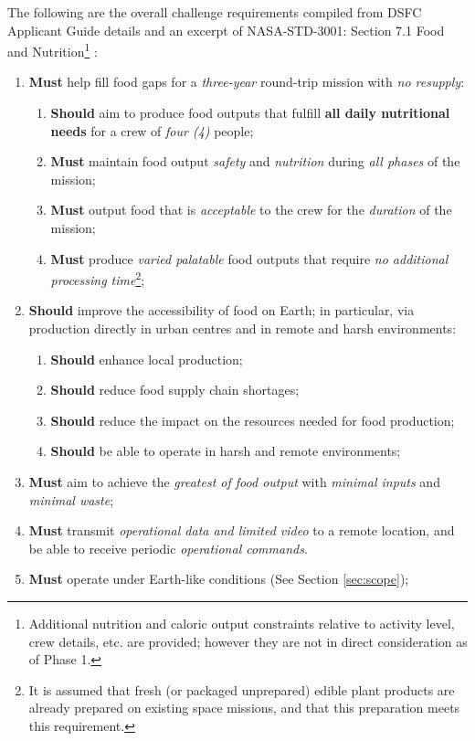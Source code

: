 \documentclass{report}
\begin{document}
The following are the overall challenge requirements compiled from DSFC Applicant Guide details \cite{applicantguide} and an excerpt of NASA-STD-3001: Section 7.1 Food and Nutrition\footnote{Additional nutrition and caloric output constraints relative to activity level, crew details, etc. are provided; however they are not in direct consideration as of Phase 1.} \cite{nutrition}:
\begin{enumerate}[label=R\arabic*., ref=R\arabic*]
    \item \label{r:1} \textbf{Must} help fill food gaps for a \textit{three-year} round-trip mission with 
    \textit{no resupply}:
    \begin{enumerate}[ref=R1\alph*]
        \item \label{r:1a} \textbf{Should} aim to produce food outputs that fulfill \textbf{all 
        daily nutritional needs} for a crew of \textit{four (4)} people;
        \item \label{r:1b} \textbf{Must} maintain food output \textit{safety} and \textit{nutrition} during \textit{all phases} of the mission;
        \item \label{r:1c} \textbf{Must} output food that is \textit{acceptable} to the crew for the \textit{duration} of the mission;
        \item \label{r:1d} \textbf{Must} produce \textit{varied palatable} food outputs that require \textit{no additional processing time}\footnote{It is 
        assumed that fresh (or packaged unprepared) edible plant products are already 
        prepared on existing space missions, and that this preparation meets this requirement.};
    \end{enumerate}
    \item \label{r:2} \textbf{Should} improve the accessibility of food on Earth; in particular, via production 
    directly in urban centres and in remote and harsh environments:
    \begin{enumerate}[ref=R2\alph*]
        \item \label{r:2a} \textbf{Should} enhance local production;
        \item \label{r:2b} \textbf{Should} reduce food supply chain shortages;
        \item \label{r:2c} \textbf{Should} reduce the impact on the resources needed for food production;
        \item \label{r:2d} \textbf{Should} be able to operate in harsh and remote environments;
    \end{enumerate}
    \item \label{r:3} \textbf{Must} aim to achieve the \textit{greatest of food output} with \textit{minimal inputs} and \textit{minimal waste};
    \item \label{r:4} \textbf{Must} transmit \textit{operational data and limited video} to a remote location, and be able to receive periodic \textit{operational commands}.
    \item \label{r:5} \textbf{Must} operate under Earth-like conditions (See Section \ref{sec:scope});
\end{enumerate}
\end{document}
